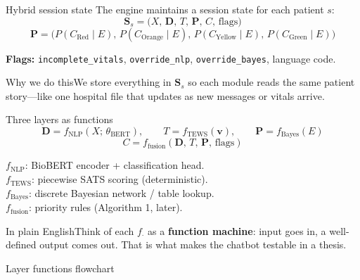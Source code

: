 \documentclass[aspectratio=169,11pt]{beamer}
\newcommand{\why}[1]{\begin{block}{Why we do this}\small #1\end{block}}
\newcommand{\plain}[1]{\begin{block}{In plain English}\small #1\end{block}}
\begin{document}
\begin{frame}{Hybrid session state}
	The engine maintains a session state for each patient $s$:
	\[
	\mathbf{S}_s = \bigl(X,\, \mathbf{D},\, T,\, \mathbf{P},\, C,\, \text{flags}\bigr)
	\]
	\[
	\mathbf{P} = \bigl(P(C_{\text{Red}}\mid E),\, P(C_{\text{Orange}}\mid E),\, P(C_{\text{Yellow}}\mid E),\, P(C_{\text{Green}}\mid E)\bigr)
	\]

	\textbf{Flags:} \texttt{incomplete\_vitals}, \texttt{override\_nlp}, \texttt{override\_bayes}, language code.

	\why{We store everything in $\mathbf{S}_s$ so each module reads the same patient story---like one hospital file that updates as new messages or vitals arrive.}
\end{frame}

\begin{frame}{Three layers as functions}
	\[
	\mathbf{D} = f_{\text{NLP}}(X;\,\theta_{\text{BERT}}),
	\qquad
	T = f_{\text{TEWS}}(\mathbf{v}),
	\qquad
	\mathbf{P} = f_{\text{Bayes}}(E)
	\]
	\[
	C = f_{\text{fusion}}(\mathbf{D},\, T,\, \mathbf{P},\,\text{flags})
	\]

	\vspace{0.4em}
	$f_{\text{NLP}}$: BioBERT encoder + classification head.\\
	$f_{\text{TEWS}}$: piecewise SATS scoring (deterministic).\\
	$f_{\text{Bayes}}$: discrete Bayesian network / table lookup.\\
	$f_{\text{fusion}}$: priority rules (Algorithm 1, later).

	\plain{Think of each $f_{\cdot}$ as a \textbf{function machine}: input goes in, a well-defined output comes out. That is what makes the chatbot testable in a thesis.}
\end{frame}

\begin{frame}{Layer functions flowchart}
	\begin{center}
	\end{center}
\end{frame}
\end{document}
